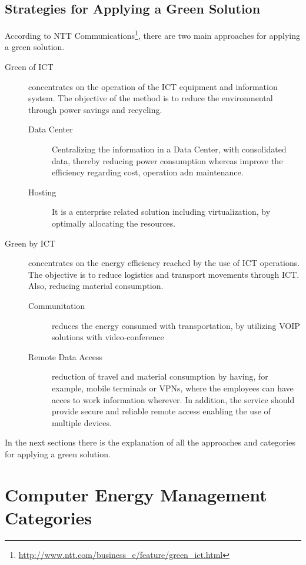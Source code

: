         
        \subsection{Strategies for Applying a Green Solution} \label{sec2:strategies_applying_green_solution}
            According to NTT Communications\footnote{\url{http://www.ntt.com/business_e/feature/green_ict.html}}, there are two main approaches for applying a green solution.
            \begin{description}
            	\item[Green of ICT] concentrates on the operation of the ICT equipment and information system. The objective of the method is to reduce the environmental through power savings and recycling.
                	\begin{description}
                		\item[Data Center] Centralizing the information in a Data Center, with consolidated data, thereby reducing power consumption whereas improve the efficiency regarding cost, operation adn maintenance.
                		\item[Hosting] It is a enterprise related solution including virtualization, by optimally allocating the resources.
                	\end{description}
            	\item[Green by ICT] concentrates on the energy efficiency reached by the use of ICT operations. The objective is to reduce logistics and transport movements through ICT. Also, reducing material consumption.
            	    \begin{description}
            	    	\item[Communitation] reduces the energy consumed with transportation, by utilizing VOIP solutions with video-conference
            	    	\item[Remote Data Access] reduction of travel and material consumption by having, for example, mobile terminals or VPNs, where the employees can have acces to work information wherever. In addition, the service should provide secure and reliable remote access enabling the use of multiple devices.
            	    \end{description}
            \end{description}
            In the next sections there is the explanation of all the approaches and categories for applying a green solution.
            
    \section{Computer Energy Management Categories} \label{sec2:energy_categories}

